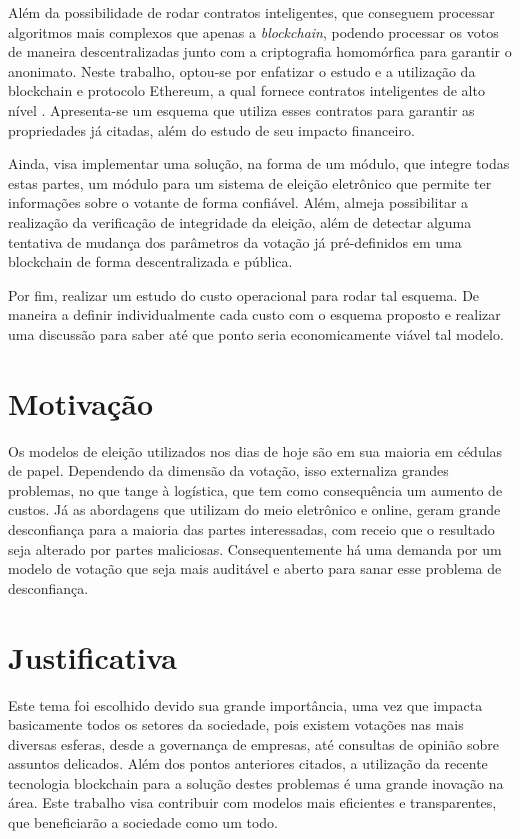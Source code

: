 \documentclass{ufsctex/ufsctex}
\begin{document}
Além da possibilidade de rodar contratos inteligentes, que conseguem processar
algoritmos mais complexos que apenas a \textit{blockchain}, podendo processar
os votos de maneira descentralizadas junto com a criptografia homomórfica para
garantir o anonimato. Neste trabalho, optou-se por enfatizar o estudo e a
utilização da blockchain e protocolo Ethereum, a qual fornece contratos
inteligentes de alto nível \cite{ethereum}.  Apresenta-se um esquema que
utiliza esses contratos para garantir as propriedades já citadas, além do
estudo de seu impacto financeiro.

Ainda, visa implementar uma solução, na forma de um módulo, que integre todas
estas partes, um módulo para um sistema de eleição eletrônico que permite ter
informações sobre o votante de forma confiável. Além, almeja possibilitar a
realização da verificação de integridade da eleição, além de detectar alguma
tentativa de mudança dos parâmetros da votação já pré-definidos em uma
blockchain de forma descentralizada e pública.

Por fim, realizar um estudo do custo operacional para rodar tal esquema. De
maneira a definir individualmente cada custo com o esquema proposto e realizar
uma discussão para saber até que ponto seria economicamente viável tal modelo.

\section{Motivação}

Os modelos de eleição utilizados nos dias de hoje são em sua maioria em cédulas
de papel. Dependendo da dimensão da votação, isso externaliza grandes
problemas, no que tange à logística, que tem como consequência um aumento de
custos. Já as abordagens que utilizam do meio eletrônico e online, geram grande
desconfiança para a maioria das partes interessadas, com receio que o resultado
seja alterado por partes maliciosas. Consequentemente há uma demanda por um
modelo de votação que seja mais auditável e aberto para sanar esse problema de
desconfiança.

\section{Justificativa}

Este tema foi escolhido devido sua grande importância, uma vez que impacta
basicamente todos os setores da sociedade, pois existem votações nas mais
diversas esferas, desde a governança de empresas, até consultas de opinião
sobre assuntos delicados.  Além dos pontos anteriores citados, a utilização da
recente tecnologia blockchain para a solução destes problemas é uma grande
inovação na área. Este trabalho visa contribuir com modelos mais eficientes e
transparentes, que beneficiarão a sociedade como um todo.
\end{document}
